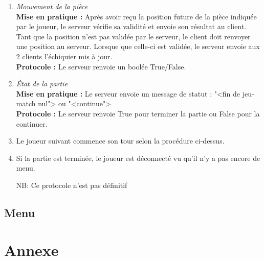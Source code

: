 \documentclass[10pt, a4paper]{article}
\begin{document}
\begin{enumerate}
\item \textit{Mouvement de la pièce} \\
\textbf{Mise en pratique :} Après avoir reçu la position future de la pièce indiquée par le joueur, le serveur vérifie sa validité et envoie son résultat au client. Tant que la position n'est pas validée par le serveur, le client doit renvoyer une position au serveur. Lorsque que celle-ci est validée, le serveur envoie aux 2 clients l'échiquier mis à jour.  \\
\textbf{Protocole :} Le serveur renvoie un boolée True/False. 

\item \textit{État de la partie} \\
\textbf{Mise en pratique :} Le serveur envoie un message de statut : "<fin de jeu-match nul"> ou "<continue"> \\
\textbf{Protocole :} Le serveur renvoie True pour terminer la partie ou False pour la continuer. 

\item Le joueur suivant commence son tour selon la procédure ci-dessus.

\item Si la partie est terminée, le joueur est déconnecté vu qu'il n'y a pas encore de menu.

NB: Ce protocole n'est pas définitif
\end{enumerate}

\subsection{Menu}

\section{Annexe}
\end{document}
